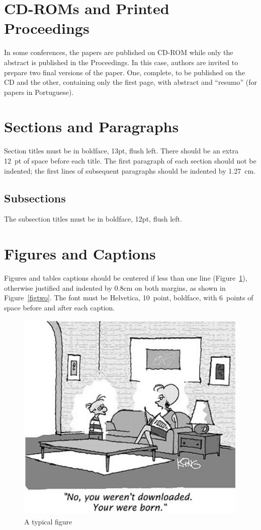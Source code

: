 \documentclass{SBCbookchapter}
\begin{document}
\section{CD-ROMs and Printed Proceedings}
In some conferences, the papers are published on CD-ROM while only the
abstract is published in the Proceedings. In this case, authors are
invited to prepare two final versions of the paper. One, complete, to
be published on the CD and the other, containing only the first page,
with abstract and ``resumo'' (for papers in Portuguese).

\section{Sections and Paragraphs}
Section titles must be in boldface, 13pt, flush left. There should be
an extra 12~pt of space before each title. The first paragraph of each
section should not be indented; the first lines of subsequent
paragraphs should be indented by 1.27~cm.

\subsection{Subsections}
The subsection titles must be in boldface, 12pt, flush left.

\section{Figures and Captions}
\label{sec:captionmargins}
Figures and tables captions should be centered if less than one line
(Figure~\ref{figone}), otherwise justified and indented by 0.8cm on
both margins, as shown in Figure~\ref{figtwo}. The font must be
Helvetica, 10~point, boldface, with 6~points of space before and after
each caption.

\begin{figure}[h!]
	\centerline{\includegraphics{fig1}}
	\caption{A typical figure}
	\label{figone}
\end{figure}
\end{document}
